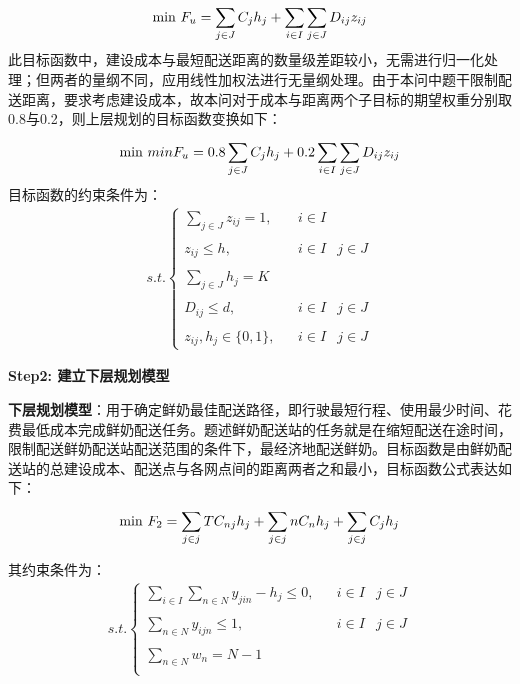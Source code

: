 \documentclass[withoutpreface,bwprint]{cumcmthesis} %
\begin{document}
		\begin{align*}
		{\rm{min}}~{{F}_{u}}=\sum_{j\in J}^{}{{{C}_{j}}}{{h}_{j}}+\sum_{i\in I}^{}{\sum_{j\in J}^{}{{{D}_{ij}}}}{{z}_{ij}}
	\end{align*}
此目标函数中，建设成本与最短配送距离的数量级差距较小，无需进行归一化处理；但两者的量纲不同，应用线性加权法进行无量纲处理。由于本问中题干限制配送距离，要求考虑建设成本，故本问对于成本与距离两个子目标的期望权重分别取0.8与0.2，则上层规划的目标函数变换如下：
	\begin{align*}
	{\rm{min}}~min{{F}_{u}}=0.8\sum_{j\in J}^{}{{{C}_{j}}}{{h}_{j}}+0.2\sum_{i\in I}^{}{\sum_{j\in J}^{}{{{D}_{ij}}}}{{z}_{ij}}
	\end{align*}
	目标函数的约束条件为：
	\begin{align*}
		s.t.\left \{{\begin{matrix}\sum_{j\in J}^{}{{{z}_{ij}}}=1,&&i\in I&\\&&&\\{{z}_{ij}}\le h,&&i\in I&j\in J\\&&&\\\sum_{j\in J}^{}{{{h}_{j}}=K}&&&\\&&&\\{{D}_{ij}}\le d,&&i\in I&j\in J\\&&&\\{{z}_{ij}},{{h}_{j}}\in \{0,1\},&&i\in I&j\in J\end{matrix}}\right .
	\end{align*}


\textbf{Step2: 建立下层规划模型}

\textbf{下层规划模型}：用于确定鲜奶最佳配送路径，即行驶最短行程、使用最少时间、花费最低成本完成鲜奶配送任务。题述鲜奶配送站的任务就是在缩短配送在途时间，限制配送鲜奶配送站配送范围的条件下，最经济地配送鲜奶。目标函数是由鲜奶配送站的总建设成本、配送点与各网点间的距离两者之和最小，目标函数公式表达如下：
	\begin{align*}
		{\rm{min}}~{{F}_{2}}=\sum_{j\in j}^{}{T{{C}_{nj}}}{{h}_{j}}+\sum_{j\in j}^{}{n{{C}_{n}}}{{h}_{j}}+\sum_{j\in j}^{}{{{C}_{j}}}{{h}_{j}}
	\end{align*}

其约束条件为：
	\begin{align*}
s.t.\left \{{\begin{matrix}\sum_{i\in I}^{}{\sum_{n\in N}^{}{{{y}_{jin}}}}-{{h}_{j}}\le 0,&&i\in I&j\in J\\&&&\\\sum_{n\in N}^{}{{{y}_{ijn}}}\le 1,&&i\in I&j\in J\\&&&\\\sum_{n\in N}^{}{{{w}_{n}}}=N-1&&&\\&&&\end{matrix}}\right .
	\end{align*}
	
\end{document}
